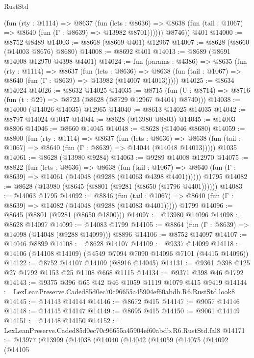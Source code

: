 \begin{lexlean}{RustStd}
\begin{coremodule}
            (fun (rty : @1114) =>
            @8637
              (fun (lets : @8636) =>
              @8638 (fun (tail : @1067) => @8640 (fun (Γ : @8639) => @13982 @8701))))))
        @8746))
    @401
@14000 := @8752 @8489
@14003 := @8668 (@8669 @401) @12967
@14007 := @8628 (@8660 (@14003 @8676) @8680)
@14008 := @8692 @401
@14013 := @8689 (@8691 @14008 @12970 @4398 @4401)
@14024 := fun (params : @4386) =>
  @8635
    (fun (rty : @1114) =>
    @8637
      (fun (lets : @8636) =>
      @8638 (fun (tail : @1067) => @8640 (fun (Γ : @8639) => @13982 (@14007 @14013)))))
@14025 := @8634 @14024
@14026 := @8632 @14025
@14035 := @8715
    (fun (U : @8714) => @8716 (fun (t : @29) => @8723 (@8628 (@8729 @12967 @4404) @8740)))
@14038 := @14000 (@14026 @14035) @12965
@14040 := @8613 @14025 @14035
@14042 := @8797 @14024 @1047
@14044 := @8628 (@13980 @8803)
@14045 := @14003 @8806
@14046 := @8660 @14045
@14048 := @8628 (@14046 @8680)
@14059 := @8800
    (fun (rty : @1114) =>
    @8637
      (fun (lets : @8636) =>
      @8638 (fun (tail : @1067) => @8640 (fun (Γ : @8639) => @14044 (@14048 @14013)))))
    @1035
@14061 := @8628 (@13980 @9284)
@14063 := @9289 @14008 @12970
@14075 := @8822
    (fun (lets : @8636) =>
    @8638
      (fun (tail : @1067) =>
      @8640 (fun (Γ : @8639) => @14061 (@14048 (@9288 (@14063 @4398 @4401))))))
    @1795
@14082 := @8628 (@13980 (@8645 (@8801 (@9281 (@8650 (@1796 @4401))))))
@14083 := @14063 @1795
@14092 := @8846
    (fun (tail : @1067) => @8640 (fun (Γ : @8639) => @14082 (@14048 (@9288 (@14083 @4401)))))
    @1799
@14096 := @8645 (@8801 (@9281 (@8650 @1800)))
@14097 := @13980 @14096
@14098 := @8628 @14097
@14099 := @14083 @1799
@14105 := @8864 (fun (Γ : @8639) => @14098 (@14048 (@9288 @14099))) @8896
@14106 := @8752 @14097
@14107 := @14046 @8899
@14108 := @8628 @14107
@14109 := @9337 @14099
@14118 := @14106 (@14108 @14109) (@4549 @7094 @7090 @14096 @7101 (@4415 @14096))
@14122 := @8752 @14107 @14109 (@8916 @14045)
@14131 := @9361 @398 @125 @27 @1792 @1153 @25 @1108 @668 @1115
@14134 := @9371 @398 @46 @1792
@14143 := @9375 @396 @65 @42 @46 @1059 @1119 @1079 @415 @9419
@14144 := LexLeanPreserve.Caded85d0ec70c96655a45904ef60abdb.R6.RustStd.look8
@14145 := @14143 @14144
@14146 := @8672 @415
@14147 := @9057 @14146
@14148 := @14145 @14147
@14149 := @8695 @415
@14150 := @9061 @14149
@14151 := @14148 @14150
@14152 := LexLeanPreserve.Caded85d0ec70c96655a45904ef60abdb.R6.RustStd.fal8
@14171 := @13977
    (@13999
      (@14038
        (@14040
          (@14042
            (@14059
              (@14075
                (@14092
                  (@14105

\end{coremodule}
\end{lexlean}
